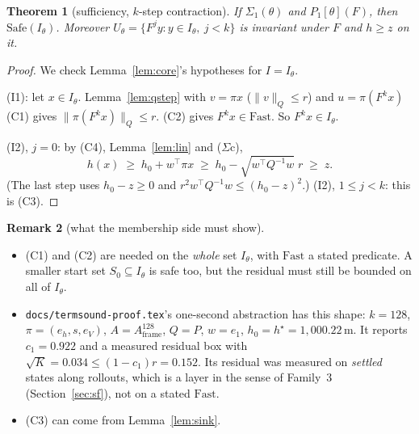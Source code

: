 \documentclass[11pt]{article}
\newtheorem{theorem}{Theorem}
\theoremstyle{definition}
\newtheorem{remark}[theorem]{Remark}
\newcommand{\Fast}{\ensuremath{\mathrm{Fast}}}
\newcommand{\nQ}[1]{\|#1\|_Q}
\begin{document}
\begin{theorem}[sufficiency, $k$-step contraction]\label{thm:k}
If $\Sigma_1(\theta)$ and $P_1[\theta](F)$, then $\mathrm{Safe}(I_\theta)$. Moreover $U_\theta = \{F^j y : y \in I_\theta,\ j < k\}$ is invariant under $F$ and $h \ge z$ on it.
\end{theorem}
\begin{proof}
We check Lemma~\ref{lem:core}'s hypotheses for $I = I_\theta$.

(I1): let $x \in I_\theta$. Lemma~\ref{lem:qstep} with $v = \pi x$ ($\nQ{v} \le r$) and $u = \pi(F^k x)$ (C1) gives $\nQ{\pi(F^k x)} \le r$. (C2) gives $F^k x \in \Fast$. So $F^k x \in I_\theta$.

(I2), $j = 0$: by (C4), Lemma~\ref{lem:lin} and ($\Sigma$c),
\[ h(x) \;\ge\; h_0 + w^\top \pi x \;\ge\; h_0 - \sqrt{w^\top Q^{-1} w}\; r \;\ge\; z. \]
(The last step uses $h_0 - z \ge 0$ and $r^2 w^\top Q^{-1} w \le (h_0 - z)^2$.) (I2), $1 \le j < k$: this is (C3).
\end{proof}

\begin{remark}[what the membership side must show]\label{rem:kmember}
\begin{itemize}
\item (C1) and (C2) are needed on the \emph{whole} set $I_\theta$, with $\Fast$ a stated predicate. A smaller start set $S_0 \subseteq I_\theta$ is safe too, but the residual must still be bounded on all of $I_\theta$.
\item \texttt{docs/termsound-proof.tex}'s one-second abstraction has this shape: $k = 128$, $\pi = (e_h, s, e_V)$, $A = A_{\mathrm{frame}}^{128}$, $Q = P$, $w = e_1$, $h_0 = h^\star = 1{,}000.22$\,m. It reports $c_1 = 0.922$ and a measured residual box with $\sqrt{K} = 0.034 \le (1 - c_1) r = 0.152$. Its residual was measured on \emph{settled} states along rollouts, which is a layer in the sense of Family~3 (Section~\ref{sec:sf}), not on a stated $\Fast$.
\item (C3) can come from Lemma~\ref{lem:sink}.
\end{itemize}
\end{remark}
\end{document}
